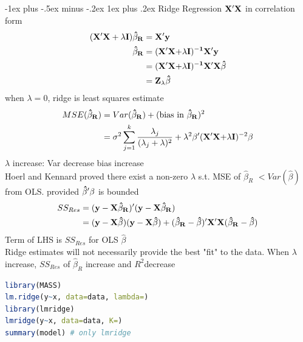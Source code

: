 \documentclass[a4paper,12pt,landscape]{article}
\makeatletter
\renewcommand{\subsubsection}{\@startsection{subsubsection}{3}{0mm}%
                                {-1ex plus -.5ex minus -.2ex}%
                                {1ex plus .2ex}%
                                {\normalfont\small\bfseries\color{violet}}}
\makeatother
\begin{document}
\begin{multicols}{3}
        \subsubsection{Ridge Regression}
        $\bold{X'X}$ in correlation form
        \begin{align*}
            \bold{(X'X+\lambda\bold{I}})\bold{\hat\beta_R} &= \bold{X'y}\\
            \bold{\hat\beta_R} &= (\bold{X'X+}\lambda\bold{I)^{-1}X'y}\\
                               &=(\bold{X'X+}\lambda\bold{I)^{-1}X'X\hat\beta}\\
                               &=\bold{Z_\lambda\hat\beta}
        \end{align*}
        when $\lambda=0$, ridge is least squares estimate
        \begin{align*}
            MSE(\bold{\hat\beta_R}) &= Var(\bold{\hat\beta_R}) + (\text{bias in }\bold{\hat\beta_R})^2\\
                                    &=\sigma^2\sum_{j=1}^k\frac{\lambda_j}{(\lambda_j+\lambda)^2}+
                                    \lambda^2\bold{\beta'(X'X+}\lambda\bold{I})^{-2}\bold{\beta}
        \end{align*}
        $\lambda$ increase: Var decrease bias increase\\
    Hoerl and Kennard proved there exist a non-zero $\lambda$ s.t. MSE of $\hat\beta_R$ $<Var(\hat\beta)$ from OLS.
    provided $\bold{\hat\beta'\beta}$ is bounded
    \begin{align*}
        SS_{Res} &= \bold{(y-X\hat\beta_R)'(y-X\hat\beta_R)}\\
                 &=\bold{(y-X\hat\beta)(y-X\hat\beta)+(\hat\beta_R-\hat\beta)'X'X(\hat\beta_R-\hat\beta)}
    \end{align*}
    Term of LHS is $SS_{Res}$ for OLS $\hat\beta$\\
    Ridge estimates will not necessarily provide the best "fit" to the data.
    When $\lambda$ increase, $SS_{Res}$ of $\hat\beta_R$ increase and $R^2$decrease
            \begin{lstlisting}[language=R]
library(MASS)
lm.ridge(y~x, data=data, lambda=)
library(lmridge)
lmridge(y~x, data=data, K=)
summary(model) # only lmridge
            \end{lstlisting}


\end{multicols}
\end{document}

